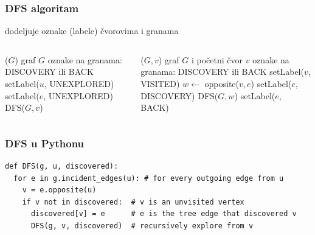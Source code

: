 \documentclass[compress]{beamer}
\begin{document}
\begin{frame}[fragile]
  \frametitle{DFS algoritam}
  dodeljuje oznake (labele) čvorovima i granama
  {\footnotesize
  \begin{columns}
    \begin{column}[t]{6cm}
      \begin{algorithmic}
        \STATE {}($G$)
        \REQUIRE graf $G$
        \ENSURE oznake na granama: {\scriptsize DISCOVERY} ili {\scriptsize BACK}
          \STATE setLabel($u$, {\scriptsize UNEXPLORED})
        \ENDFOR
          \STATE setLabel($e$, {\scriptsize UNEXPLORED})
        \ENDFOR
            \STATE DFS($G,v$)
          \ENDIF
        \ENDFOR
      \end{algorithmic}
    \end{column}
    \begin{column}[t]{6cm}
      \begin{algorithmic}
        \STATE {}($G,v$)
        \REQUIRE graf $G$ i početni čvor $v$
        \ENSURE oznake na granama: {\scriptsize DISCOVERY} ili {\scriptsize BACK}
        \STATE setLabel($v$, {\scriptsize VISITED})
            \STATE $w \leftarrow$ opposite($v,e$)
              \STATE setLabel($e$, {\scriptsize DISCOVERY})
              \STATE DFS($G, w$)
            \ELSE
              \STATE setLabel($e$, {\scriptsize BACK})
            \ENDIF
          \ENDIF
        \ENDFOR
      \end{algorithmic}
    \end{column}
  \end{columns}
  }
\end{frame}

\begin{frame}[fragile,shrink=15]
  \frametitle{DFS u Pythonu}
\begin{verbatim}
def DFS(g, u, discovered):
  for e in g.incident_edges(u): # for every outgoing edge from u
    v = e.opposite(u)
    if v not in discovered:  # v is an unvisited vertex
      discovered[v] = e      # e is the tree edge that discovered v
      DFS(g, v, discovered)  # recursively explore from v
\end{verbatim}
\end{frame}
\end{document}
